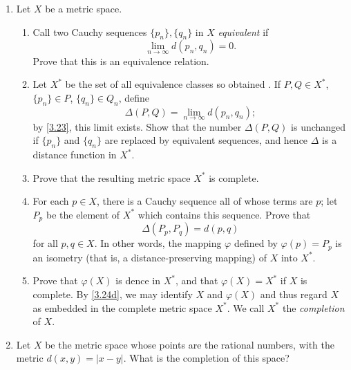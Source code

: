 \begin{enumerate}
{\[    \]
    it follows that
    \[
    \lvert d(p_n, q_n) - d(p_m, q_m)\rvert
    \]
    is small if \(m\) and \(n\) are large.}
\item
  Let \(X\) be a metric space.
  \begin{enumerate}[label = (\alph*), ref = \theenumi{} (\alph*)]
  \item
    Call two Cauchy sequences \(\{p_n\},\{q_n\}\) in \(X\) \textit{equivalent}
    if
    \[
    \lim_{n\to\infty} d(p_n,q_n) = 0.
    \]
    Prove that this is an equivalence relation.
  \item
    Let \(X^*\) be the set of all equivalence classes so obtained .
    If \(P,Q\in X^*\), \(\{p_n\}\in P\),
    \(\{q_n\}\in Q_n\), define
    \[
    \Delta(P,Q) = \lim_{n\to\infty} d(p_n, q_n);
    \]
    by \cref{3.23}, this limit exists.
    Show that the number \(\Delta(P,Q)\) is unchanged if \(\{p_n\}\) and
    \(\{q_n\}\) are replaced by equivalent sequences, and hence \(\Delta\)
    is a distance function in \(X^*\).
  \item
    Prove that the resulting metric space \(X^*\) is complete.
  \item
    \label{3.24d}
    For each \(p\in X\), there is a Cauchy sequence all of whose terms are
    \(p\); let \(P_p\) be the element of \(X^*\) which contains this sequence.
    Prove that
    \[
    \Delta(P_p, P_q) = d(p, q)
    \]
    for all \(p,q\in X\).
    In other words, the mapping \(\varphi\) defined by \(\varphi(p) = P_p\) is
    an isometry (that is, a distance-preserving mapping) of \(X\) into \(X^*\).
  \item
    Prove that \(\varphi(X)\) is dence in \(X^*\), and that
    \(\varphi(X) = X^*\) if \(X\) is complete.
    By \cref{3.24d}, we may identify \(X\) and \(\varphi(X)\) and thus regard
    \(X\) as embedded in the complete metric space \(X^*\).
    We call \(X^*\) the \textit{completion} of \(X\).
  \end{enumerate}
\item
  Let \(X\) be the metric space whose points are the rational numbers, with the
  metric \(d(x,y) = \lvert x - y\rvert\).
  What is the completion of this space?
\end{enumerate}
